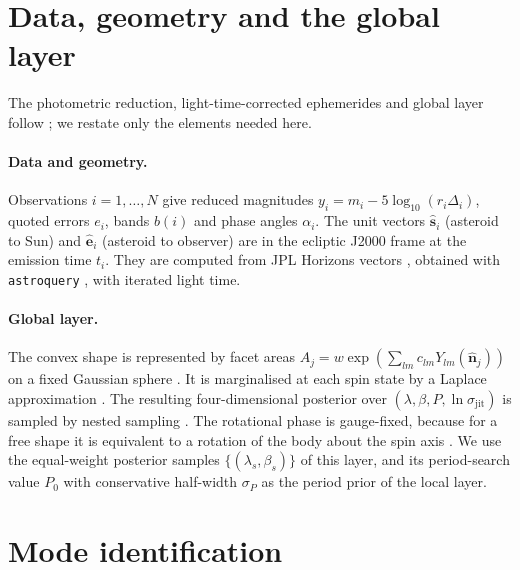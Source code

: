 \documentclass[11pt,a4paper]{article}
\theoremstyle{remark}
\newcommand{\uv}[1]{\hat{\bm{#1}}}
\begin{document}
\section{Data, geometry and the global layer}
\label{sec:global}

The photometric reduction, light-time-corrected ephemerides and global layer follow
\citet{lcinv_convex2026}; we restate only the elements needed here.

\paragraph{Data and geometry.} Observations $i=1,\dots,N$ give reduced magnitudes
$y_i=m_i-5\log_{10}(r_i\Delta_i)$, quoted errors $e_i$, bands $b(i)$ and phase angles $\alpha_i$.
The unit vectors $\uv s_i$ (asteroid to Sun) and $\uv e_i$ (asteroid to observer) are in the ecliptic
J2000 frame at the emission time $t_i$. They are computed from JPL Horizons vectors
\citep{giorgini1996}, obtained with \texttt{astro\-query} \citep{ginsburg2019}, with iterated light time.

\paragraph{Global layer.} The convex shape is represented by facet areas
$A_j=w\exp(\sum_{lm}c_{lm}Y_{lm}(\uv n_j))$ on a fixed Gaussian sphere \citep{kaasalainen2001a}. It is
marginalised at each spin state by a Laplace approximation \citep{tierney1986}. The resulting
four-dimensional posterior over $(\lambda,\beta,P,\ln\sigma_{\mathrm{jit}})$ is sampled by nested
sampling \citep{skilling2006,speagle2020}. The rotational phase is gauge-fixed, because for a free shape
it is equivalent to a rotation of the body about the spin axis \citep{lcinv_convex2026}. We use the
equal-weight posterior samples $\{(\lambda_s,\beta_s)\}$ of this layer, and its period-search value
$P_0$ with conservative half-width $\sigma_P$ as the period prior of the local layer.

\section{Mode identification}
\label{sec:modes}
\end{document}
